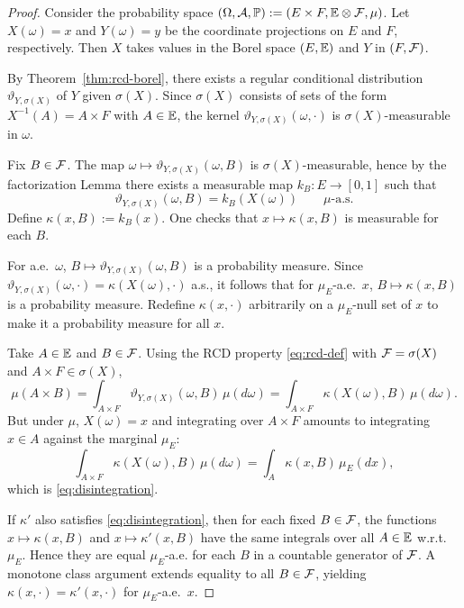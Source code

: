 \begin{proof}
Consider the probability space $(\Omega,\mathcal{A},\mathbb{P}):=(E\times F,\mathbb{E}\otimes\mathcal{F},\mu)$.
Let $X(\omega)=x$ and $Y(\omega)=y$ be the coordinate projections on $E$ and $F$, respectively.
Then $X$ takes values in the Borel space $(E,\mathbb{E})$ and $Y$ in $(F,\mathcal{F})$.

By Theorem~\ref{thm:rcd-borel}, there exists a regular conditional distribution
$\vartheta_{Y,\sigma(X)}$ of $Y$ given $\sigma(X)$.
Since $\sigma(X)$ consists of sets of the form $X^{-1}(A)=A\times F$ with $A\in\mathbb{E}$,
the kernel $\vartheta_{Y,\sigma(X)}(\omega,\cdot)$ is $\sigma(X)$-measurable in $\omega$.

Fix $B\in\mathcal{F}$. The map $\omega\mapsto \vartheta_{Y,\sigma(X)}(\omega,B)$ is $\sigma(X)$-measurable, hence by the factorization Lemma
there exists a measurable map $k_B:E\to[0,1]$ such that
\[
\vartheta_{Y,\sigma(X)}(\omega,B)=k_B(X(\omega))\qquad \mu\text{-a.s.}
\]
Define $\kappa(x,B):=k_B(x)$. One checks that $x\mapsto \kappa(x,B)$ is measurable for each $B$.

For a.e.\ $\omega$, $B\mapsto \vartheta_{Y,\sigma(X)}(\omega,B)$ is a probability measure.
Since $\vartheta_{Y,\sigma(X)}(\omega,\cdot)=\kappa(X(\omega),\cdot)$ a.s., it follows that for $\mu_E$-a.e.\ $x$,
$B\mapsto \kappa(x,B)$ is a probability measure. Redefine $\kappa(x,\cdot)$ arbitrarily on a $\mu_E$-null set of $x$ to make it a probability measure for all $x$.

Take $A\in\mathbb{E}$ and $B\in\mathcal{F}$. Using the RCD property \eqref{eq:rcd-def} with $\mathcal{F}=\sigma(X)$ and $A\times F\in\sigma(X)$,
\[
\mu(A\times B)
= \int_{A\times F} \vartheta_{Y,\sigma(X)}(\omega,B)\,\mu(d\omega)
= \int_{A\times F} \kappa(X(\omega),B)\,\mu(d\omega).
\]
But under $\mu$, $X(\omega)=x$ and integrating over $A\times F$ amounts to integrating $x\in A$ against the marginal $\mu_E$:
\[
\int_{A\times F} \kappa(X(\omega),B)\,\mu(d\omega)=\int_A \kappa(x,B)\,\mu_E(dx),
\]
which is \eqref{eq:disintegration}.

If $\kappa'$ also satisfies \eqref{eq:disintegration}, then for each fixed $B\in\mathcal{F}$,
the functions $x\mapsto \kappa(x,B)$ and $x\mapsto \kappa'(x,B)$ have the same integrals over all $A\in\mathbb{E}$ w.r.t.\ $\mu_E$.
Hence they are equal $\mu_E$-a.e. for each $B$ in a countable generator of $\mathcal{F}$.
A monotone class argument extends equality to all $B\in\mathcal{F}$, yielding $\kappa(x,\cdot)=\kappa'(x,\cdot)$ for $\mu_E$-a.e.\ $x$.
\end{proof}

